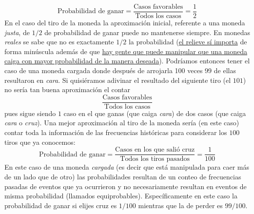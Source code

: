 \documentclass[
]{book}
\begin{document}
\[
\text{Probabilidad de ganar} = \dfrac{\text{Casos favorables}}{\text{Todos los casos}} = \dfrac{1}{2}
\]
En el caso del tiro de la moneda la aproximación inicial, referente a una moneda \emph{justa}, de \(1/2\) de probabilidad de ganar puede no mantenerse siempre. En monedas \emph{reales} se sabe que no es exactamente \(1/2\) la probabilidad (\href{https://statweb.stanford.edu/~susan/papers/headswithJ.pdf}{el relieve sí importa} de forma minúscula además de que \href{https://www.ncbi.nlm.nih.gov/pmc/articles/PMC2789164/}{hay gente que puede manipular que una moneda caiga con mayor probabilidad de la manera deseada}). Podríamos entonces tener el caso de una moneda cargada donde después de arrojarla 100 veces 99 de ellas resultaron en \emph{cara}. Si quisiéramos adivinar el resultado del siguiente tiro (el \(101\)) no sería tan buena aproximación el contar
\[
\dfrac{\text{Casos favorables}}{\text{Todos los casos}}
\]
pues sigue siendo \(1\) caso en el que ganas (que caiga \emph{cara}) de dos casos (que caiga \emph{cara} o \emph{cruz}). Una mejor aproximación al tiro de la moneda sería (en este caso) contar toda la información de las frecuencias históricas para considerar los \(100\) tiros que ya conocemos:
\[
\text{Probabilidad de ganar} =  \dfrac{\text{Casos en los que salió cruz}}{\text{Todos los tiros pasados}} = \dfrac{1}{100}
\]
En este caso de una moneda \emph{cargada} (es decir que está manipulada para caer más de un lado que de otro) las probabilidades resultan de un conteo de frecuencias pasadas de eventos que ya ocurrieron y no necesariamente resultan en eventos de misma probabilidad (llamados equiprobables). Específicamente en este caso la probabilidad de ganar si elijes cruz es \(1/100\) mientras que la de perder es \(99/100\).
\end{document}
